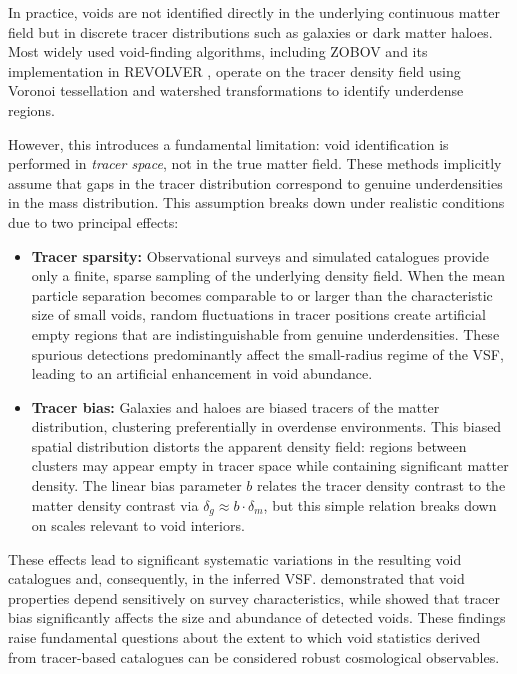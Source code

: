 \documentclass[12pt]{report}
\begin{document}
In practice, voids are not identified directly in the underlying continuous matter field but in discrete tracer distributions such as galaxies or dark matter haloes. Most widely used void-finding algorithms, including ZOBOV \citep{Neyrinck2008} and its implementation in REVOLVER \citep{Nadathur2019}, operate on the tracer density field using Voronoi tessellation and watershed transformations to identify underdense regions.

However, this introduces a fundamental limitation: void identification is performed in \emph{tracer space}, not in the true matter field. These methods implicitly assume that gaps in the tracer distribution correspond to genuine underdensities in the mass distribution. This assumption breaks down under realistic conditions due to two principal effects:

\begin{itemize}
    \item \textbf{Tracer sparsity:} Observational surveys and simulated catalogues provide only a finite, sparse sampling of the underlying density field. When the mean particle separation becomes comparable to or larger than the characteristic size of small voids, random fluctuations in tracer positions create artificial empty regions that are indistinguishable from genuine underdensities. These spurious detections predominantly affect the small-radius regime of the VSF, leading to an artificial enhancement in void abundance.

    \item \textbf{Tracer bias:} Galaxies and haloes are biased tracers of the matter distribution, clustering preferentially in overdense environments. This biased spatial distribution distorts the apparent density field: regions between clusters may appear empty in tracer space while containing significant matter density. The linear bias parameter $b$ relates the tracer density contrast to the matter density contrast via $\delta_g \approx b \cdot \delta_m$, but this simple relation breaks down on scales relevant to void interiors.
\end{itemize}

These effects lead to significant systematic variations in the resulting void catalogues and, consequently, in the inferred VSF. \citet{Nadathur2015a} demonstrated that void properties depend sensitively on survey characteristics, while \citet{Contarini2019} showed that tracer bias significantly affects the size and abundance of detected voids. These findings raise fundamental questions about the extent to which void statistics derived from tracer-based catalogues can be considered robust cosmological observables.
\end{document}
